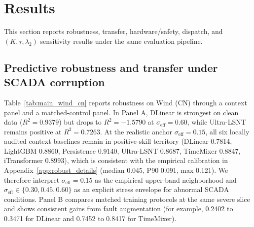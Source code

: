 \documentclass[review,1p,times]{elsarticle}
\begin{document}
\section{Results}
\label{sec:results}
This section reports robustness, transfer, hardware/safety, dispatch, and $(K,\tau,\lambda_2)$ sensitivity results under the same evaluation pipeline.

\subsection{Predictive robustness and transfer under SCADA corruption}
\label{subsec:results_main}
\label{subsec:results_robustness}
\label{subsubsec:universal_noise}
Table~\ref{tab:main_wind_cn} reports robustness on Wind (CN) through a context panel and a matched-control panel. In Panel A, DLinear is strongest on clean data ($R^2=0.9379$) but drops to $R^2=-1.5790$ at $\sigma_{\mathrm{eff}}=0.60$, while Ultra-LSNT remains positive at $R^2=0.7263$. At the realistic anchor $\sigma_{\mathrm{eff}}=0.15$, all six locally audited context baselines remain in positive-skill territory (DLinear 0.7814, LightGBM 0.8860, Persistence 0.9140, Ultra-LSNT 0.8687, TimeMixer 0.8847, iTransformer 0.8993), which is consistent with the empirical calibration in Appendix~\ref{app:robust_details} (median 0.045, P90 0.091, max 0.121). We therefore interpret $\sigma_{\mathrm{eff}}=0.15$ as the empirical upper-band neighborhood and $\sigma_{\mathrm{eff}}\in\{0.30,0.45,0.60\}$ as an explicit stress envelope for abnormal SCADA conditions. Panel B compares matched training protocols at the same severe slice and shows consistent gains from fault augmentation (for example, 0.2402 to 0.3471 for DLinear and 0.7452 to 0.8417 for TimeMixer).
\end{document}
